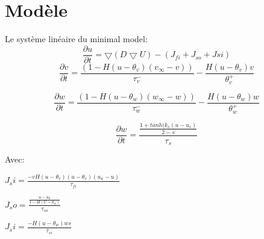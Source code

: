 \documentclass[a4paper,12pt,twoside]{report}
\begin{document}
\section{Modèle}




Le système linéaire du minimal model: 
\begin{equation}
\frac{\partial u}{\partial t}=\bigtriangledown( D \bigtriangledown U )-(J_{fi}+J_{so}+	J{si})
\end{equation}
\begin{equation}
\frac{\partial v}{\partial t}=\frac{(1-H(u-\theta_v)(v_\infty -v))}{\tau_v^-}-\frac{H(u-\theta_v)v}{\theta_v^+}
\end{equation}

\begin{equation}
\frac{\partial w}{\partial t}=\frac{(1-H(u-\theta_w)(w_\infty -w))}{\tau_w^-}-\frac{H(u-\theta_w)w}{\theta_w^+}
\end{equation}

\begin{equation}
\frac{\partial w}{\partial t}=\frac{\frac{1+tanh(k_s(u-u_s)}{2-s}}{\tau_s}
\end{equation}

Avec:

$J_si=\frac{-vH(u-\theta_v)(u-\theta_v)(u_u-u)}{\tau_{fi}}$


$J_so=\frac{\frac{u-u_0}{1-H(U-\theta_w)}}{\tau_{so}}$


$J_si=\frac{-H(u-\theta_w)ws}{\tau_{si}}$
\end{document}
